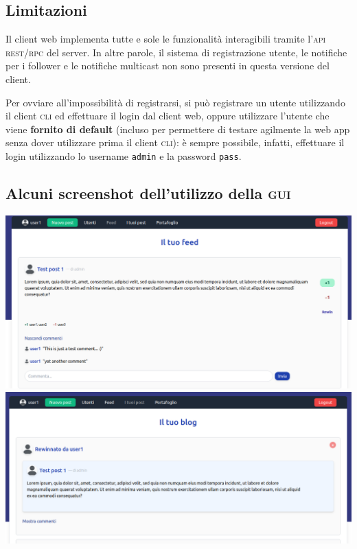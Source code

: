 \documentclass[a4paper,8pt]{article} %
\def\code#1{\texttt{#1}}
\begin{document}
\subsection{Limitazioni}
Il client web implementa tutte e sole le funzionalità interagibili tramite l'\textsc{api} \textsc{rest}/\textsc{rpc} del server.
In altre parole, il sistema di registrazione utente, le notifiche per i follower e le notifiche multicast non sono presenti in questa versione del client.
\par Per ovviare all'impossibilità di registrarsi, si può registrare un utente utilizzando il client \textsc{cli} ed effettuare il login dal client web, oppure utilizzare l'utente
che viene \textbf{fornito di default} (incluso per permettere di testare agilmente la web app senza dover utilizzare prima il client \textsc{cli}): è sempre possibile, infatti, effettuare il login utilizzando lo username \code{admin} e la password \code{pass}.
\subsection{Alcuni screenshot dell'utilizzo della \textsc{gui}}
\includegraphics[width=\textwidth]{feed.png}\vspace*{1cm}
\includegraphics[width=\textwidth]{rewin.png}\newpage
\end{document}
